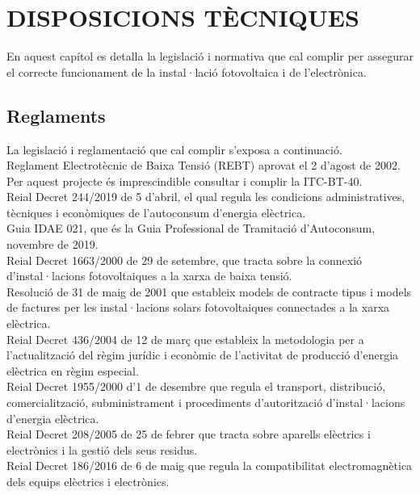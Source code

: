 \chapter{\uppercase{Disposicions tècniques}}
En aquest capítol es detalla la legislació i normativa que cal complir per assegurar el correcte funcionament de la instal·lació fotovoltaica i de l'electrònica. 

\section{Reglaments}
La legislació i reglamentació que cal complir s'exposa a continuació.\\
\newline Reglament Electrotècnic de Baixa Tensió (REBT) aprovat el 2 d'agost de 2002. Per aquest projecte és imprescindible consultar i complir la ITC-BT-40.\\
\newline Reial Decret 244/2019 de 5 d'abril, el qual regula les condicions administratives, tècniques i econòmiques de l'autoconsum d'energia elèctrica.\\
\newline Guia IDAE 021, que és la Guia Professional de Tramitació d'Autoconsum, novembre de 2019.\\
\newline Reial Decret 1663/2000 de 29 de setembre, que tracta sobre la connexió d'instal·lacions fotovoltaiques a la xarxa de baixa tensió.\\
\newline Resolució de 31 de maig de 2001 que estableix models de contracte tipus i models de factures per les instal·lacions solars fotovoltaiques connectades a la xarxa elèctrica.\\
\newline Reial Decret 436/2004 de 12 de març que estableix la metodologia per a l'actualització del règim jurídic i econòmic de l'activitat de producció d'energia elèctrica en règim especial.\\
\newline Reial Decret 1955/2000 d'1 de desembre que regula el transport, distribució, comercialització, subministrament i procediments d'autorització d'instal·lacions d'energia elèctrica.\\
\newline Reial Decret 208/2005 de 25 de febrer que tracta sobre aparells elèctrics i electrònics i la gestió dels seus residus.\\
\newline Reial Decret 186/2016 de 6 de maig que regula la compatibilitat electromagnètica dels equips elèctrics i electrònics.\\
